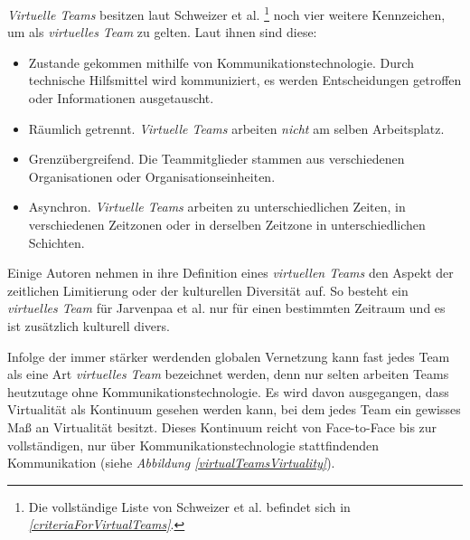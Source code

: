 \documentclass[a4paper,11pt]{article}%
\renewcommand{\\}{\vspace*{0.5\baselineskip} \newline}
\begin{document}
\textit{Virtuelle Teams} besitzen laut Schweizer et al. \citep[S. 270]{schweitzer2010conceptualizing}\footnote{Die vollständige Liste von Schweizer et al. befindet sich in \textit{\autoref{criteriaForVirtualTeams}}.} noch vier weitere Kennzeichen, um als \textit{virtuelles Team} zu gelten. Laut ihnen sind diese:
\label{AnforderungenLautSchweitzer}
\begin{itemize}
\item Zustande gekommen mithilfe von Kommunikationstechnologie. Durch technische Hilfsmittel wird kommuniziert, es werden Entscheidungen getroffen oder Informationen ausgetauscht.
\item Räumlich getrennt. \textit{Virtuelle Teams} arbeiten \textit{nicht} am selben Arbeitsplatz.
\item Grenzübergreifend. Die Teammitglieder stammen aus verschiedenen Organisationen oder Organisationseinheiten.
\item Asynchron. \textit{Virtuelle Teams} arbeiten zu unterschiedlichen Zeiten, in verschiedenen Zeitzonen oder in derselben Zeitzone in unterschiedlichen Schichten.
\end{itemize}

Einige Autoren nehmen in ihre Definition eines \textit{virtuellen Teams} den Aspekt der zeitlichen Limitierung oder der kulturellen Diversität auf. So besteht ein \textit{virtuelles Team} für Jarvenpaa et al. \citep[S. 1-2]{jarvenpaa1999communication} nur für einen bestimmten Zeitraum und es ist zusätzlich kulturell divers.

Infolge der immer stärker werdenden globalen Vernetzung kann fast jedes Team als eine Art \textit{virtuelles Team} bezeichnet werden, denn nur selten arbeiten Teams heutzutage ohne Kommunikationstechnologie. 
Es wird davon ausgegangen, dass Virtualität als Kontinuum gesehen werden kann, bei dem jedes Team ein gewisses Maß an Virtualität besitzt. Dieses Kontinuum reicht von Face-to-Face bis zur vollständigen, nur über Kommunikationstechnologie stattfindenden Kommunikation \citep{martins2004virtual} (siehe \textit{Abbildung \ref{virtualTeamsVirtuality}}).
\end{document}
